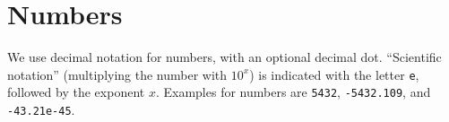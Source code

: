\section*{Numbers}

We use decimal notation for numbers, with an optional decimal dot. ``Scientific notation''
(multiplying the number with $10^x$) is indicated with the letter \texttt{e}, followed
by the exponent $x$.
Examples for numbers are \texttt{5432}, \texttt{-5432.109}, and \texttt{-43.21e-45}.
